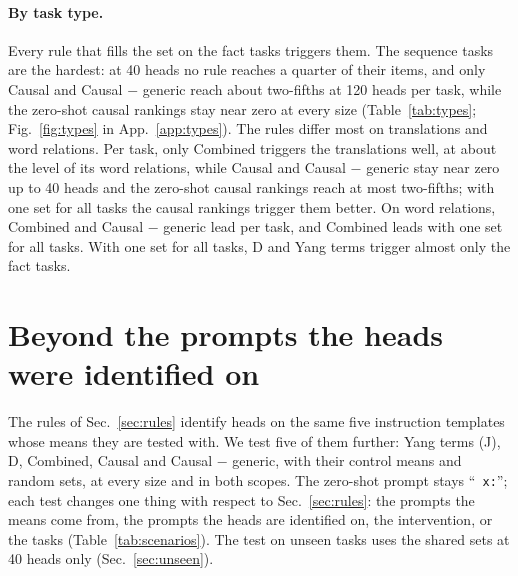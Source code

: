 \documentclass[10pt,a4paper]{article}
\newcommand{\p}[1]{``\texttt{#1}''}
\begin{document}
\begin{table}[tbp]
\centering\small

\caption{Accuracy by task type at 40 heads, mean over the tasks of the type and the two folds. --: the rule does not fill 40 heads on every task of the type. Fig.~\ref{fig:types} shows every size.}
\label{tab:types}
\end{table}

\paragraph{By task type.} Every rule that fills the set on the fact tasks triggers them. The sequence tasks are the hardest: at 40 heads no rule reaches a quarter of their items, and only Causal and Causal $-$ generic reach about two-fifths at 120 heads per task, while the zero-shot causal rankings stay near zero at every size (Table~\ref{tab:types}; Fig.~\ref{fig:types} in App.~\ref{app:types}). The rules differ most on translations and word relations. Per task, only Combined triggers the translations well, at about the level of its word relations, while Causal and Causal $-$ generic stay near zero up to 40 heads and the zero-shot causal rankings reach at most two-fifths; with one set for all tasks the causal rankings trigger them better. On word relations, Combined and Causal $-$ generic lead per task, and Combined leads with one set for all tasks. With one set for all tasks, D and Yang terms trigger almost only the fact tasks.

\section{Beyond the prompts the heads were identified on}\label{sec:beyond}

The rules of Sec.~\ref{sec:rules} identify heads on the same five instruction templates whose means they are tested with. We test five of them further: Yang terms (J), D, Combined, Causal and Causal $-$ generic, with their control means and random sets, at every size and in both scopes. The zero-shot prompt stays \p{ x:}; each test changes one thing with respect to Sec.~\ref{sec:rules}: the prompts the means come from, the prompts the heads are identified on, the intervention, or the tasks (Table~\ref{tab:scenarios}). The test on unseen tasks uses the shared sets at 40 heads only (Sec.~\ref{sec:unseen}).
\end{document}

